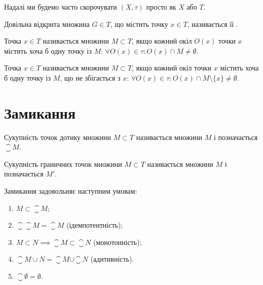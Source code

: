\begin{abuse}
Надалі ми будемо часто скорочувати $(X, \tau)$ просто як $X$ або $T$.
\end{abuse}

\begin{definition}
Довільна відкрита множина $G \in T$, що
містить точку $x \in T$, називається її .
\end{definition}

\begin{definition}
Точка $x \in T$ називається 
множини $M \subset T$, якщо кожний окіл $O(x)$ точки $x$ містить
хоча б одну точку із $M$: $\forall O(x) \in \tau: O(x) \cap M \ne \emptyset$.
\end{definition}

\begin{definition}
Точка $x \in T$ називається 
множини $M \subset T$, якщо кожний окіл точки $x$ містить хоча
б одну точку із $M$, що не збігається з $x$:
$\forall O(x) \in \tau: O(x) \cap M \setminus \{x\} \ne \emptyset$.
\end{definition}

\section{Замикання}

\begin{definition}
Сукупність точок дотику множини $M \subset T$
називається  множини $M$ і позначається $\closure M$.
\end{definition}

\begin{definition}
Сукупність граничних точок множини
$M \subset T$ називається  множини $M$ і позначається
$M'$.
\end{definition}

\begin{theorem}
 Замикання
задовольняє наступним умовам:
\begin{enumerate}
\item $M \subset \closure M$;
\item $\closure{\closure{M}} = \closure M$ (ідемпотентність);
\item $M \subset N \implies \closure M \subset \closure N$ (монотонність);
\item $\closure {M \cup N} = \closure M \cup \closure N$ (адитивність).
\item $\closure \emptyset = \emptyset$.
\end{enumerate}
\end{theorem}

